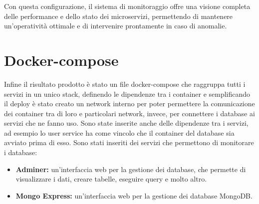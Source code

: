 Con questa configurazione, il sistema di monitoraggio offre una visione completa delle performance e dello stato dei microservizi, permettendo di mantenere un'operatività ottimale e di intervenire prontamente in caso di anomalie.


\section{Docker-compose}

Infine il risultato prodotto è stato un file docker-compose che raggruppa tutti i servizi in un unico stack, definendo le dipendenze tra i container e semplificando il deploy
è stato creato un network interno per poter permettere la comunicazione dei container tra di loro e particolari network, invece, per connettere i database ai servizi che ne fanno uso.
Sono state inserite anche delle dipendenze tra i servizi, ad esempio lo user service ha come vincolo che il container del database sia avviato prima di esso. 
\vspace{0.5cm}
Sono stati inseriti dei servizi che permettono di monitorare i database: 
\begin{itemize}
    \item \textbf{Adminer:} un'interfaccia web per la gestione dei database, che permette di visualizzare i dati, creare tabelle, eseguire query e molto altro.
    \item \textbf{Mongo Express:} un'interfaccia web per la gestione dei database MongoDB.
\end{itemize}

